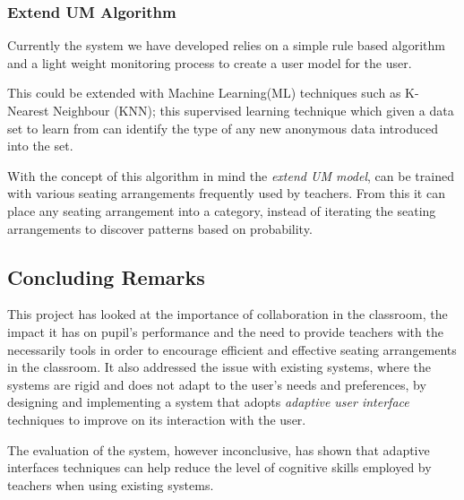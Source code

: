\subsubsection{Extend UM Algorithm}
Currently the system we have developed relies on a simple rule based algorithm and a light weight monitoring process to create a user model for the user. 

This could be extended with Machine Learning(ML) techniques such as K-Nearest Neighbour (KNN); this supervised learning technique which given a data set to learn from can identify the type of any new anonymous data introduced into the set. 

With the concept of this algorithm in mind the \emph{extend UM model}, can be trained with various seating arrangements frequently used by teachers. From this it can place any seating arrangement into a category, instead of iterating the seating arrangements to discover patterns based on probability.  
 
\subsection{Concluding Remarks} 
This project has looked at the importance of collaboration in the classroom, the impact it has on pupil's performance and the need to provide teachers with the necessarily tools in order to encourage efficient and effective seating arrangements in the classroom. It also addressed the issue with existing systems, where the systems are rigid and does not adapt to the user's needs and preferences, by designing and implementing a system that adopts \emph{adaptive user interface} techniques to improve on its interaction with the user.

The evaluation of the system, however inconclusive, has shown that adaptive interfaces techniques can help reduce the level of cognitive skills employed by teachers when using existing systems. 